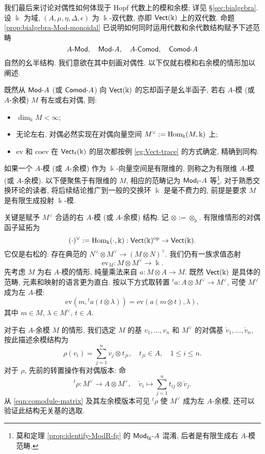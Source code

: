 我们最后来讨论对偶性如何体现于 Hopf 代数上的模和余模; 详见 \S\ref{sec:bialgebra}. 设 $\Bbbk$ 为域, $(A, \mu, \eta, \Delta, \epsilon)$ 为 $\Bbbk$-双代数, 亦即 $\mathsf{Vect}(\Bbbk)$ 上的双代数. 命题 \ref{prop:bialgebra-Mod-monoidal} 已说明如何同时运用代数和余代数结构赋予下述范畴
\[ A\text{-}\mathsf{Mod}, \quad \mathsf{Mod}\text{-}A, \quad A\text{-}\mathsf{Comod}, \quad \mathsf{Comod}\text{-}A \]
自然的幺半结构. 我们意欲在其中刻画对偶性. 以下仅就右模和右余模的情形加以阐述.

既然从 $\mathsf{Mod}\text{-}A$ (或 $\mathsf{Comod}\text{-}A$) 向 $\mathsf{Vect}(\Bbbk)$ 的忘却函子是幺半函子, 若右 $A$-模 (或 $A$-余模) $M$ 有左或右对偶, 则:
\begin{itemize}
	\item $\dim_{\Bbbk} M < \infty$;
	\item 无论左右, 对偶必然实现在对偶向量空间 $M^\vee := \operatorname{Hom}_{\Bbbk}(M, \Bbbk)$ 上;
	\item $\mathrm{ev}$ 和 $\mathrm{coev}$ 在 $\mathsf{Vect}_{\mathrm{f}}(\Bbbk)$ 的层次都按例 \ref{eg:Vect-trace} 的方式确定, 精确到同构.
\end{itemize}

如果一个 $A$-模 (或 $A$-余模) 作为 $\Bbbk$-向量空间是有限维的, 则称之为有限维 $A$-模 (或 $A$-余模). 以下便聚焦于有限维的 $M$, 相应的范畴记为 $\mathsf{Mod}_{\mathrm{f}}\text{-}A$ 等\footnote{莫和定理 \ref{prop:identify-ModR-fg} 的 $\mathsf{Mod}_{\mathrm{fg}}\text{-}A$ 混淆, 后者是有限生成右 $A$-模范畴.}. 对于熟悉交换环论的读者, 将后续结论推广到一般的交换环 $\Bbbk$ 是毫不费力的, 前提是要求 $M$ 是有限生成投射 $\Bbbk$-模.

关键是赋予 $M^\vee$ 合适的右 $A$-模 (或 $A$-余模) 结构. 记 $\otimes := \otimes_{\Bbbk}$. 有限维情形的对偶函子延拓为
\[ (\cdot)^\vee := \operatorname{Hom}_{\Bbbk}(\cdot, \Bbbk): \mathsf{Vect}(\Bbbk)^{\operatorname{op}} \to \mathsf{Vect}(\Bbbk). \]
它仅是右松的: 存在典范的 $N^\vee \otimes M^\vee \to (M \otimes N)^\vee$. 我们仍有一族求值态射
\[ \mathrm{ev}_M: M \otimes M^\vee \to \Bbbk. \]
先考虑 $M$ 为右 $A$-模的情形, 纯量乘法来自 $a: M \otimes A \to M$. 既然 $\mathsf{Vect}(\Bbbk)$ 是具体的范畴, 元素和映射的语言更为直白. 按以下方式取转置 ${}^t a: A \otimes M^\vee \to M^\vee$, 可使 $M^\vee$ 成为左 $A$-模:
\[ \mathrm{ev}\left(m, {}^t a(t \otimes \lambda)\right) = \mathrm{ev}\left( a(m \otimes t), \lambda \right), \]
其中 $m \in M$, $\lambda \in M^\vee$, $t \in A$.

对于右 $A$-余模 $M$ 的情形, 我们选定 $M$ 的基 $v_1, \ldots, v_n$ 和 $M^\vee$ 的对偶基 $\check{v}_1, \ldots, \check{v}_n$, 按此描述余模结构为
\begin{equation}\label{eqn:comodule-basis}
	\rho(v_i) = \sum_{j=1}^n v_j \otimes t_{ji}, \quad t_{ji} \in A, \quad 1 \leq i \leq n.
\end{equation}
对于 $\rho$, 先前的转置操作有对偶版本: 命
\[ {}^t \rho: M^\vee \to A \otimes M^\vee, \quad \check{v}_i \mapsto \sum_{j=1}^n t_{ij} \otimes \check{v}_j. \]
从 \eqref{eqn:comodule-matrix} 及其左余模版本可见 ${}^t \rho$ 使 $M^\vee$ 成为左 $A$-余模, 还可以验证此结构无关基的选取.


